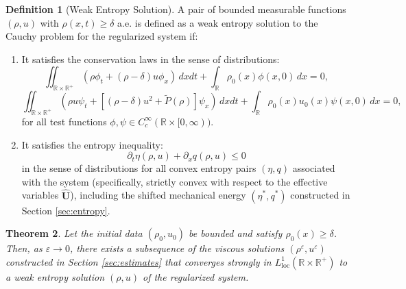 \documentclass[12pt, reqno]{article}
\newtheorem{theorem}{Theorem}[section]
\theoremstyle{definition}
\newtheorem{definition}[theorem]{Definition}
\numberwithin{equation}{section}
\begin{document}
\begin{definition}[Weak Entropy Solution]
A pair of bounded measurable functions $(\rho, u)$ with $\rho(x,t) \ge \delta$ a.e. is defined as a weak entropy solution to the Cauchy problem for the regularized system if:
\begin{enumerate}
    \item It satisfies the conservation laws in the sense of distributions:
    \begin{equation}
        \iint_{\mathbb{R} \times \mathbb{R}^+} \left( \rho \phi_t + (\rho-\delta) u \phi_x \right) \, dx dt + \int_{\mathbb{R}} \rho_0(x) \phi(x,0) \, dx = 0,
    \end{equation}
    \begin{equation}
        \iint_{\mathbb{R} \times \mathbb{R}^+} \left( \rho u \psi_t + \left[ (\rho-\delta) u^2 + \tilde{P}(\rho) \right] \psi_x \right) \, dx dt + \int_{\mathbb{R}} \rho_0(x) u_0(x) \psi(x,0) \, dx = 0,
    \end{equation}
    for all test functions $\phi, \psi \in C_c^\infty(\mathbb{R} \times [0, \infty))$.
    
    \item It satisfies the entropy inequality:
    \begin{equation}
        \partial_t \eta(\rho, u) + \partial_x q(\rho, u) \le 0
    \end{equation}
    in the sense of distributions for all convex entropy pairs $(\eta, q)$ associated with the system (specifically, strictly convex with respect to the effective variables $\hat{\mathbf{U}}$), including the shifted mechanical energy $(\eta^*, q^*)$ constructed in Section \ref{sec:entropy}.
\end{enumerate}
\end{definition}

\begin{theorem}
\label{thm:fixed_delta_1}
Let the initial data $(\rho_0, u_0)$ be bounded and satisfy $\rho_0(x) \ge \delta$. Then, as $\varepsilon \to 0$, there exists a subsequence of the viscous solutions $(\rho^\varepsilon, u^\varepsilon)$ constructed in Section \ref{sec:estimates} that converges strongly in $L^1_{\mathrm{loc}}(\mathbb{R} \times \mathbb{R}^+)$ to a weak entropy solution $(\rho, u)$ of the regularized system.
\end{theorem}
\end{document}
